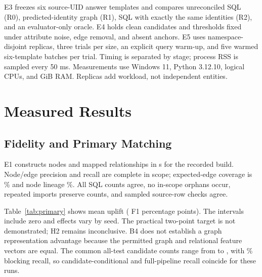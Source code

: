 \documentclass[conference]{IEEEtran}
\begin{document}
E3 freezes six source-UID answer templates and compares unreconciled SQL (R0), predicted-identity graph (R1), SQL with exactly the same identities (R2), and an evaluator-only oracle. E4 holds clean candidates and thresholds fixed under attribute noise, edge removal, and absent anchors. E5 uses namespace-disjoint replicas, three trials per size, an explicit query warm-up, and five warmed six-template batches per trial. Timing is separated by stage; process RSS is sampled every 50 ms. Measurements use Windows 11, Python 3.12.10, \CpuCount{} logical CPUs, and \RamGiB{} GiB RAM. Replicas add workload, not independent entities.

\section{Measured Results}
\subsection{Fidelity and Primary Matching}
E1 constructs \GraphNodes{} nodes and \GraphEdges{} mapped relationships in \GraphBuildSeconds{} s for the recorded build. Node/edge precision and recall are complete in scope; expected-edge coverage is \EdgeCoverage{}\% and node lineage \NodeLineage{}\%. All SQL counts agree, no in-scope orphans occur, repeated imports preserve counts, and \LineageAuditCount{} sampled source-row checks agree.

\begin{table}[t]
\caption{Primary ambiguous held-out F1 on identical candidates. Each seed has \TestGroups{} total held-out canonical groups; pair counts refer to the ambiguous subset. Intervals use paired entity multiplicities.}
\label{tab:primary}
\centering
\end{table}

Table~\ref{tab:primary} shows mean uplift \MeanDelta{} (\MeanDeltaPoints{} F1 percentage points). The intervals include zero and effects vary by seed. The practical two-point target is not demonstrated; H2 remains inconclusive. B4 does not establish a graph representation advantage because the permitted graph and relational feature vectors are equal. The common all-test candidate counts range from \MinCandidates{} to \MaxCandidates{}, with \BlockingRecall{}\% blocking recall, so candidate-conditional and full-pipeline recall coincide for these runs.

\begin{table}[t]
\caption{WDC attribute-only test results on the official fully unseen configuration. These are independent fitted baselines, not graph-context evidence.}
\label{tab:wdc}
\centering
\end{table}
\end{document}
